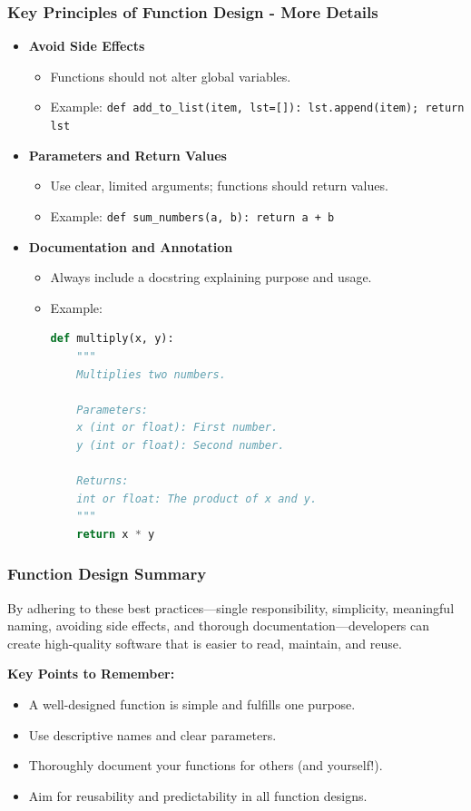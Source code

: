 \documentclass{beamer}
\begin{document}
\begin{frame}[fragile]
    \frametitle{Key Principles of Function Design - More Details}
    \begin{itemize}
        \item \textbf{Avoid Side Effects}
        \begin{itemize}
            \item Functions should not alter global variables.
            \item Example: \texttt{def add\_to\_list(item, lst=[]): lst.append(item); return lst}
        \end{itemize}
        
        \item \textbf{Parameters and Return Values}
        \begin{itemize}
            \item Use clear, limited arguments; functions should return values.
            \item Example: \texttt{def sum\_numbers(a, b): return a + b}
        \end{itemize}
        
        \item \textbf{Documentation and Annotation}
        \begin{itemize}
            \item Always include a docstring explaining purpose and usage.
            \item Example:
            \begin{lstlisting}[language=Python]
def multiply(x, y):
    """
    Multiplies two numbers.
    
    Parameters:
    x (int or float): First number.
    y (int or float): Second number.
    
    Returns:
    int or float: The product of x and y.
    """
    return x * y
            \end{lstlisting}
        \end{itemize}
    \end{itemize}
\end{frame}

\begin{frame}[fragile]
    \frametitle{Function Design Summary}
    By adhering to these best practices—single responsibility, simplicity, meaningful naming, avoiding side effects, and thorough documentation—developers can create high-quality software that is easier to read, maintain, and reuse.

    \textbf{Key Points to Remember:}
    \begin{itemize}
        \item A well-designed function is simple and fulfills one purpose.
        \item Use descriptive names and clear parameters.
        \item Thoroughly document your functions for others (and yourself!).
        \item Aim for reusability and predictability in all function designs.
    \end{itemize}
\end{frame}
\end{document}
